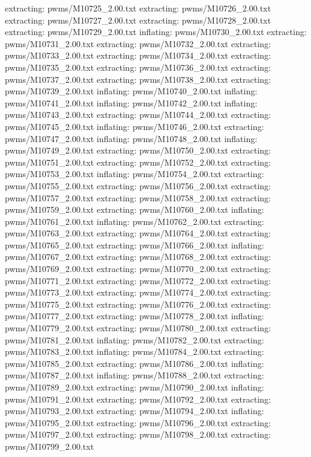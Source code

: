 \documentclass[letterpaper,10pt,english]{sphinxmanual}
\begin{document}
{\begin{sphinxVerbatim}[commandchars=\\\{\}]
 extracting: pwms/M10725\_2.00.txt
 extracting: pwms/M10726\_2.00.txt
 extracting: pwms/M10727\_2.00.txt
 extracting: pwms/M10728\_2.00.txt
 extracting: pwms/M10729\_2.00.txt
  inflating: pwms/M10730\_2.00.txt
 extracting: pwms/M10731\_2.00.txt
 extracting: pwms/M10732\_2.00.txt
 extracting: pwms/M10733\_2.00.txt
 extracting: pwms/M10734\_2.00.txt
 extracting: pwms/M10735\_2.00.txt
 extracting: pwms/M10736\_2.00.txt
 extracting: pwms/M10737\_2.00.txt
 extracting: pwms/M10738\_2.00.txt
 extracting: pwms/M10739\_2.00.txt
  inflating: pwms/M10740\_2.00.txt
  inflating: pwms/M10741\_2.00.txt
  inflating: pwms/M10742\_2.00.txt
  inflating: pwms/M10743\_2.00.txt
 extracting: pwms/M10744\_2.00.txt
 extracting: pwms/M10745\_2.00.txt
  inflating: pwms/M10746\_2.00.txt
 extracting: pwms/M10747\_2.00.txt
  inflating: pwms/M10748\_2.00.txt
  inflating: pwms/M10749\_2.00.txt
 extracting: pwms/M10750\_2.00.txt
 extracting: pwms/M10751\_2.00.txt
 extracting: pwms/M10752\_2.00.txt
 extracting: pwms/M10753\_2.00.txt
  inflating: pwms/M10754\_2.00.txt
 extracting: pwms/M10755\_2.00.txt
 extracting: pwms/M10756\_2.00.txt
 extracting: pwms/M10757\_2.00.txt
 extracting: pwms/M10758\_2.00.txt
 extracting: pwms/M10759\_2.00.txt
 extracting: pwms/M10760\_2.00.txt
  inflating: pwms/M10761\_2.00.txt
  inflating: pwms/M10762\_2.00.txt
 extracting: pwms/M10763\_2.00.txt
 extracting: pwms/M10764\_2.00.txt
 extracting: pwms/M10765\_2.00.txt
 extracting: pwms/M10766\_2.00.txt
  inflating: pwms/M10767\_2.00.txt
 extracting: pwms/M10768\_2.00.txt
 extracting: pwms/M10769\_2.00.txt
 extracting: pwms/M10770\_2.00.txt
 extracting: pwms/M10771\_2.00.txt
 extracting: pwms/M10772\_2.00.txt
 extracting: pwms/M10773\_2.00.txt
 extracting: pwms/M10774\_2.00.txt
 extracting: pwms/M10775\_2.00.txt
 extracting: pwms/M10776\_2.00.txt
 extracting: pwms/M10777\_2.00.txt
 extracting: pwms/M10778\_2.00.txt
  inflating: pwms/M10779\_2.00.txt
 extracting: pwms/M10780\_2.00.txt
 extracting: pwms/M10781\_2.00.txt
  inflating: pwms/M10782\_2.00.txt
 extracting: pwms/M10783\_2.00.txt
  inflating: pwms/M10784\_2.00.txt
 extracting: pwms/M10785\_2.00.txt
 extracting: pwms/M10786\_2.00.txt
  inflating: pwms/M10787\_2.00.txt
  inflating: pwms/M10788\_2.00.txt
 extracting: pwms/M10789\_2.00.txt
 extracting: pwms/M10790\_2.00.txt
  inflating: pwms/M10791\_2.00.txt
 extracting: pwms/M10792\_2.00.txt
 extracting: pwms/M10793\_2.00.txt
 extracting: pwms/M10794\_2.00.txt
  inflating: pwms/M10795\_2.00.txt
 extracting: pwms/M10796\_2.00.txt
 extracting: pwms/M10797\_2.00.txt
 extracting: pwms/M10798\_2.00.txt
 extracting: pwms/M10799\_2.00.txt

\end{sphinxVerbatim}}
\end{document}
